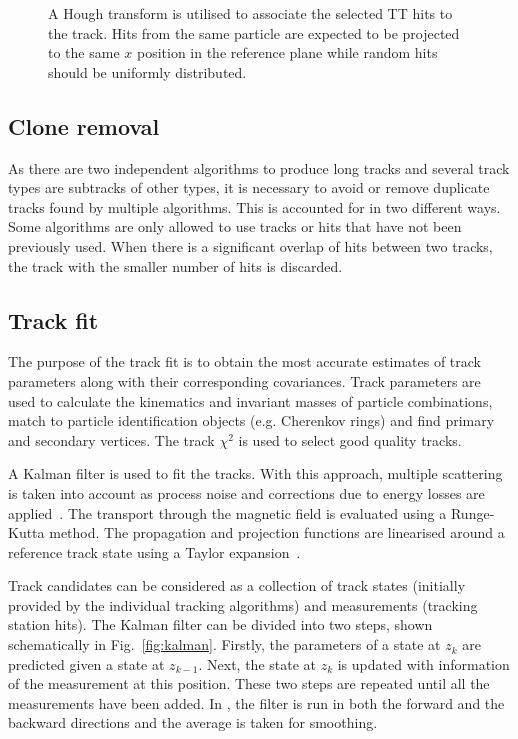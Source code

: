 \begin{figure}[!tb]
  \centering
  
  \caption{A Hough transform is utilised to associate the selected TT hits to the \velo track. Hits from the same particle are expected to be projected to the same $x$ position in the reference plane while random hits should be uniformly distributed.}
  \label{fig:velott-tracking}
\end{figure}

\subsection{Clone removal}
\label{sec:track:clone}

As there are two independent algorithms to produce long tracks and several track types are subtracks of other types, it is necessary to avoid or remove duplicate tracks found by multiple algorithms. This is accounted for in two different ways. Some algorithms are only allowed to use tracks or hits that have not been previously used. When there is a significant overlap of hits between two tracks, the track with the smaller number of hits is discarded. 

\subsection{Track fit}
\label{sec:track:fit}

The purpose of the track fit  is to obtain the most accurate estimates of track parameters along with their corresponding covariances. Track parameters are used to calculate the kinematics and invariant masses of particle combinations, match to particle identification objects (e.g. Cherenkov rings) and find primary and secondary vertices. The track $\chi^{2}$ is used to select good quality tracks. 

A Kalman filter is used to fit the tracks. With this approach, multiple scattering is taken into account as process noise and corrections due to energy losses are applied~\cite{kalman}. The transport through the magnetic field is evaluated using a Runge-Kutta method. The propagation and projection functions are linearised around a reference track state using a Taylor expansion~\cite{jeroen}.

Track candidates can be considered as a collection of track states (initially provided by the individual tracking algorithms) and measurements (tracking station hits). The Kalman filter can be divided into two steps, shown schematically in Fig.~\ref{fig:kalman}. Firstly, the parameters of a state at $z_{k}$ are predicted given a state at $z_{k-1}$. Next, the state at $z_{k}$ is updated with information of the measurement at this position. These two steps are repeated until all the measurements have been added. In \lhcb, the filter is run in both the forward and the backward directions and the average is taken for smoothing.

